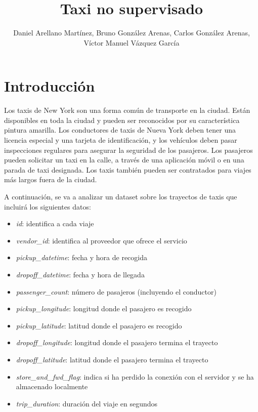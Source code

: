 \documentclass[
]{article}
\title{Taxi no supervisado}
\author{Daniel Arellano Martínez, Bruno González Arenas, Carlos González
Arenas, Víctor Manuel Vázquez García}
\date{}
\begin{document}
\maketitle

\hypertarget{introducciuxf3n}{%
\section{Introducción}\label{introducciuxf3n}}

Los taxis de New York son una forma común de transporte en la ciudad.
Están disponibles en toda la ciudad y pueden ser reconocidos por su
característica pintura amarilla. Los conductores de taxis de Nueva York
deben tener una licencia especial y una tarjeta de identificación, y los
vehículos deben pasar inspecciones regulares para asegurar la seguridad
de los pasajeros. Los pasajeros pueden solicitar un taxi en la calle, a
través de una aplicación móvil o en una parada de taxi designada. Los
taxis también pueden ser contratados para viajes más largos fuera de la
ciudad.

A continuación, se va a analizar un dataset sobre los trayectos de taxis
que incluirá los siguientes datos:

\begin{itemize}
\item
  \emph{id}: identifica a cada viaje
\item
  \emph{vendor\_id}: identifica al proveedor que ofrece el servicio
\item
  \emph{pickup\_datetime}: fecha y hora de recogida
\item
  \emph{dropoff\_datetime}: fecha y hora de llegada
\item
  \emph{passenger\_count}: número de pasajeros (incluyendo el conductor)
\item
  \emph{pickup\_longitude}: longitud donde el pasajero es recogido
\item
  \emph{pickup\_latitude}: latitud donde el pasajero es recogido
\item
  \emph{dropoff\_longitude}: longitud donde el pasajero termina el
  trayecto
\item
  \emph{dropoff\_latitude}: latitud donde el pasajero termina el
  trayecto
\item
  \emph{store\_and\_fwd\_flag}: indica si ha perdido la conexión con el
  servidor y se ha almacenado localmente
\item
  \emph{trip\_duration}: duración del viaje en segundos
\end{itemize}
\end{document}
